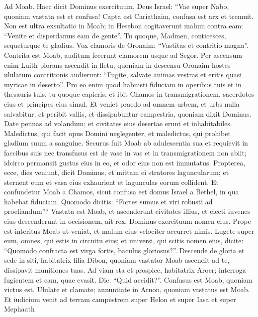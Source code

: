 \begin{biblechapter}  
\verse Ad Moab. Haec dicit Dominus exercituum, Deus Israel: “Vae super Nabo, quoniam vastata est et confusa! Capta est Cariathaim, confusa est arx et tremuit. 
\verse Non est ultra exsultatio in Moab; in Hesebon cogitaverunt malum contra eam: “Venite et disperdamus eam de gente”. Tu quoque, Madmen, conticesces, sequeturque te gladius. 
\verse Vox clamoris de Oronaim: “Vastitas et contritio magna”. 
\verse Contrita est Moab, auditum fecerunt clamorem usque ad Segor. 
\verse Per ascensum enim Luith plorans ascendit in fletu, quoniam in descensu Oronaim hostes ululatum contritionis audierunt: 
\verse “Fugite, salvate animas vestras et eritis quasi myricae in deserto”. 
\verse Pro eo enim quod habuisti fiduciam in operibus tuis et in thesauris tuis, tu quoque capieris; et ibit Chamos in transmigrationem, sacerdotes eius et principes eius simul. 
\verse Et veniet praedo ad omnem urbem, et urbs nulla salvabitur; et peribit vallis, et dissipabuntur campestria, quoniam dixit Dominus. 
\verse Date pennas ad volandum; et civitates eius desertae erunt et inhabitabiles. 
\verse Maledictus, qui facit opus Domini neglegenter, et maledictus, qui prohibet gladium suum a sanguine. 
\verse Securus fuit Moab ab adulescentia sua et requievit in faecibus suis nec transfusus est de vase in vas et in transmigrationem non abiit; idcirco permansit gustus eius in eo, et odor eius non est immutatus. 
\verse Propterea, ecce, dies veniunt, dicit Dominus, et mittam ei stratores laguncularum; et sternent eum et vasa eius exhaurient et lagunculas eorum collident. 
\verse Et confundetur Moab a Chamos, sicut confusa est domus Israel a Bethel, in qua habebat fiduciam. 
\verse Quomodo dicitis: “Fortes sumus et viri robusti ad proeliandum”? 
\verse Vastata est Moab, et ascenderunt civitates illius, et electi iuvenes eius descenderunt in occisionem, ait rex, Dominus exercituum nomen eius. 
\verse Prope est interitus Moab ut veniat, et malum eius velociter accurret nimis. 
\verse Lugete super eum, omnes, qui estis in circuitu eius; et universi, qui scitis nomen eius, dicite: “Quomodo confracta est virga fortis, baculus gloriosus?”. 
\verse Descende de gloria et sede in siti, habitatrix filia Dibon, quoniam vastator Moab ascendit ad te, dissipavit munitiones tuas. 
\verse Ad viam sta et prospice, habitatrix Aroer; interroga fugientem et eam, quae evasit. Dic: “Quid accidit?”. 
\verse Confusus est Moab, quoniam victus est. Ululate et clamate; annuntiate in Arnon, quoniam vastatus est Moab. 
\verse Et iudicium venit ad terram campestrem super Helon et super Iasa et super Mephaath 

\end{biblechapter}

